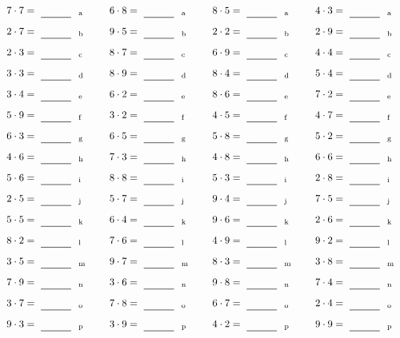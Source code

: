 \documentclass
[
  draft    = true,
  fontsize = 11pt,
  parskip  = half-
]
{scrartcl}
\begin{document}
\par\vfill\par
\begin{align*}
    \pline{7\cdot7}&=\rline{a}
  & \pline{6\cdot8}&=\rline{a}
  & \pline{8\cdot5}&=\rline{a}
  & \pline{4\cdot3}&=\rline{a} \\[1ex]
    \pline{2\cdot7}&=\rline{b}
  & \pline{9\cdot5}&=\rline{b}
  & \pline{2\cdot2}&=\rline{b}
  & \pline{2\cdot9}&=\rline{b} \\[1ex]
    \pline{2\cdot3}&=\rline{c}
  & \pline{8\cdot7}&=\rline{c}
  & \pline{6\cdot9}&=\rline{c}
  & \pline{4\cdot4}&=\rline{c} \\[1ex]
    \pline{3\cdot3}&=\rline{d}
  & \pline{8\cdot9}&=\rline{d}
  & \pline{8\cdot4}&=\rline{d}
  & \pline{5\cdot4}&=\rline{d} \\[1ex]
    \pline{3\cdot4}&=\rline{e}
  & \pline{6\cdot2}&=\rline{e}
  & \pline{8\cdot6}&=\rline{e}
  & \pline{7\cdot2}&=\rline{e} \\[1ex]
    \pline{5\cdot9}&=\rline{f}
  & \pline{3\cdot2}&=\rline{f}
  & \pline{4\cdot5}&=\rline{f}
  & \pline{4\cdot7}&=\rline{f} \\[1ex]
    \pline{6\cdot3}&=\rline{g}
  & \pline{6\cdot5}&=\rline{g}
  & \pline{5\cdot8}&=\rline{g}
  & \pline{5\cdot2}&=\rline{g} \\[1ex]
    \pline{4\cdot6}&=\rline{h}
  & \pline{7\cdot3}&=\rline{h}
  & \pline{4\cdot8}&=\rline{h}
  & \pline{6\cdot6}&=\rline{h} \\[1ex]
    \pline{5\cdot6}&=\rline{i}
  & \pline{8\cdot8}&=\rline{i}
  & \pline{5\cdot3}&=\rline{i}
  & \pline{2\cdot8}&=\rline{i} \\[1ex]
    \pline{2\cdot5}&=\rline{j}
  & \pline{5\cdot7}&=\rline{j}
  & \pline{9\cdot4}&=\rline{j}
  & \pline{7\cdot5}&=\rline{j} \\[1ex]
    \pline{5\cdot5}&=\rline{k}
  & \pline{6\cdot4}&=\rline{k}
  & \pline{9\cdot6}&=\rline{k}
  & \pline{2\cdot6}&=\rline{k} \\[1ex]
    \pline{8\cdot2}&=\rline{l}
  & \pline{7\cdot6}&=\rline{l}
  & \pline{4\cdot9}&=\rline{l}
  & \pline{9\cdot2}&=\rline{l} \\[1ex]
    \pline{3\cdot5}&=\rline{m}
  & \pline{9\cdot7}&=\rline{m}
  & \pline{8\cdot3}&=\rline{m}
  & \pline{3\cdot8}&=\rline{m} \\[1ex]
    \pline{7\cdot9}&=\rline{n}
  & \pline{3\cdot6}&=\rline{n}
  & \pline{9\cdot8}&=\rline{n}
  & \pline{7\cdot4}&=\rline{n} \\[1ex]
    \pline{3\cdot7}&=\rline{o}
  & \pline{7\cdot8}&=\rline{o}
  & \pline{6\cdot7}&=\rline{o}
  & \pline{2\cdot4}&=\rline{o} \\[1ex]
    \pline{9\cdot3}&=\rline{p}
  & \pline{3\cdot9}&=\rline{p}
  & \pline{4\cdot2}&=\rline{p}
  & \pline{9\cdot9}&=\rline{p}
\end{align*}
\end{document}
